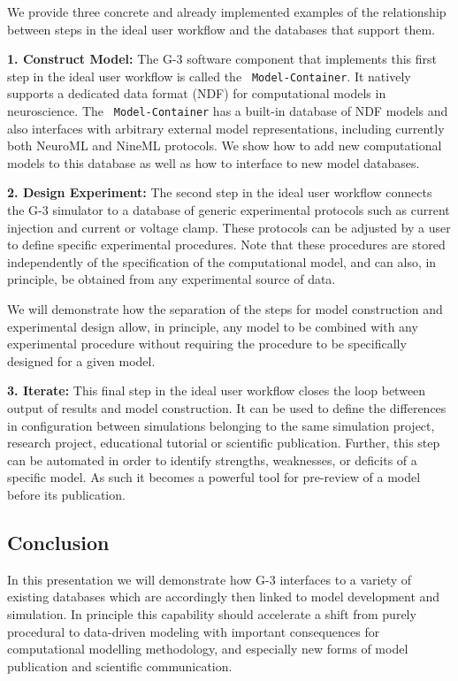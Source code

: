\documentclass[12pt]{article}
\begin{document}
We provide three concrete and already implemented examples of the
relationship between steps in the ideal user workflow and the
databases that support them.

{\bf 1. Construct Model:} The G-3 software component that implements
this first step in the ideal user workflow is called the {\tt
  Model-Container}.  It natively supports a dedicated data format
(NDF) for computational models in neuroscience.  The {\tt
  Model-Container} has a built-in database of NDF models and also
interfaces with arbitrary external model representations, including
currently both NeuroML and NineML protocols.  We show how to add new
computational models to this database as well as how to interface to
new model databases.

{\bf 2. Design Experiment:} The second step in the ideal user workflow
connects the G-3 simulator to a database of generic experimental
protocols such as current injection and current or voltage clamp.
These protocols can be adjusted by a user to define specific
experimental procedures.  Note that these procedures are stored
independently of the specification of the computational model, and can
also, in principle, be obtained from any experimental source of data.

We will demonstrate how the separation of the steps for model
construction and experimental design allow, in principle, any model to
be combined with any experimental procedure without requiring the
procedure to be specifically designed for a given model.


{\bf 3. Iterate:} This final step in the ideal user workflow closes
the loop between output of results and model construction.  It can be
used to define the differences in configuration between simulations
belonging to the same simulation project, research project,
educational tutorial or scientific publication.  Further, this step
can be automated in order to identify strengths, weaknesses, or
deficits of a specific model.  As such it becomes a powerful tool for
pre-review of a model before its publication.

\subsection*{Conclusion}

In this presentation we will demonstrate how G-3 interfaces to a
variety of existing databases which are accordingly then linked to
model development and simulation.  In principle this capability should
accelerate a shift from purely procedural to data-driven modeling with
important consequences for computational modelling methodology, and
especially new forms of model publication and scientific
communication.
\end{document}

